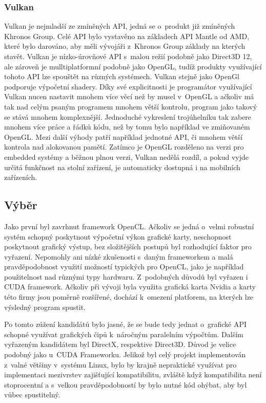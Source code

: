 \subsubsection{Vulkan}
Vulkan je nejmladší ze zmíněných API, jedná se o~produkt již zmíněných Khronos Group. Celé API bylo vystavěno na základech API Mantle od AMD, které bylo darováno, aby měli vývojáři z~Khronos Group základy na kterých stavět. Vulkan je nízko-úrovňové API s~malou režií podobně jako Direct3D 12, ale zároveň je mulltiplatformní podobně jako OpenGL, tudíž produkty využívající tohoto API lze spouštět na různých systémech. Vulkan stejně jako OpenGl podporuje výpočetní shadery. Díky své explicitnosti je programátor využívající Vulkan nucen nastavit mnohem více věcí než by musel v~OpenGL a ačkoliv má tak nad celým psaným programem mnohem větší kontrolu, program jako takový se stává mnohem komplexnější. Jednoduché vykreslení trojúhelníku tak zabere mnohem více práce a řádků kódu, než by tomu bylo například ve zmiňovaném OpenGL. Mezi další výhody patří například jednotné API, či mnohem větší kontrola nad alokovanou pamětí. Zatímco je OpenGL rozděleno na verzi pro embedded systémy a běžnou plnou verzi, Vulkan nedělá rozdíl, a pokud vyjde určitá funkčnost na stolní zařízení, je automaticky dostupná i na mobilních zařízeních. \cite{singh2016learning} \cite{vulkanSpec}

\subsection{Výběr}
Jako první byl zavrhnut framework OpenCL. Ačkoliv se jedná o~velmi robustní systém schopný poskytnout výpočetní výkon grafické karty, neschopnost poskytnout grafický výstup, bez složitějších postupů byl rozhodující faktor pro vyřazení. Nepomohly ani nízké zkušenosti s~daným frameworkem a malá pravděpodobnost využití možností typických pro OpenCL, jako je například použitelnost nad různými typy hardwaru. Z~podobných důvodů byl vyřazen i CUDA framework. Ačkoliv při vývoji byla využita grafická karta Nvidia a karty této firmy jsou poměrně rozšířené, dochází k~omezení platforem, na kterých lze výsledný program spustit.

Po tomto zúžení kandidátů bylo jasné, že se bude tedy jednat o~grafické API schopné využívat grafických čipů k~náročným paralelním výpočtům. Dalším vyřazeným kandidátem byl DirectX, respektive Direct3D. Důvod je velice podobný jako u~CUDA Frameworku. Jelikož byl celý projekt implementován z~valné většiny v~systému Linux, bylo by krajně nepraktické využívat pro implementaci mezivrstev zajišťující kompatibilitu, zvláště když kompatibilita není stoprocentní a s~velkou pravděpodobností by bylo nutné kód ohýbat, aby byl vůbec spustitelný. 

